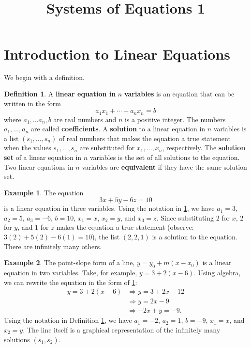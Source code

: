 \documentclass{article}
\title{Systems of Equations 1}
\author{}
\date{}
\theoremstyle{definition}
\newtheorem{definition}{Definition}
\newtheorem{example}{Example}
\begin{document}
\maketitle


\section{Introduction to Linear Equations}\label{sec:introduction}

We begin with a definition.

\begin{definition} \label{def:linear-eqn}
A \textbf{linear equation in} $n$ \textbf{variables} is an equation that can be written in the form
\[a_1x_1+\cdots+a_nx_n=b\]
where $a_1, \ldots a_n, b$ are real numbers and \(n\) is a positive integer. The numbers \(a_1, \ldots, a_n\) are called \textbf{coefficients}. A \textbf{solution} to a linear equation in \(n\) variables is a list \((s_1, \ldots, s_n)\) of real numbers that makes the equation a true statement when the values \(s_1, \ldots, s_n\) are substituted for \(x_1, \ldots, x_n\), respectively. The \textbf{solution set} of a linear equation in \(n\) variables is the set of all solutions to the equation. Two linear equations in \(n\) variables are \textbf{equivalent} if they have the same solution set.
\end{definition}

\begin{example}\label{ex:linear-eqn-3var}
The equation
\[3x+5y-6z=10\]
is a linear equation in three variables. Using the notation in \cref{def:linear-eqn}, we have \(a_1=3\), \(a_2=5\), \(a_3=-6\), \(b=10\), \(x_1=x\), \(x_2=y\), and \(x_3=z\). Since substituting \(2\) for \(x\), \(2\) for \(y\), and \(1\) for \(z\) makes the equation a true statement (observe: \(3(2)+5(2)-6(1)=10\)), the list \((2, 2, 1)\) is a solution to the equation. There are infinitely many others.
\end{example}

\begin{example}\label{ex:linear-eqn-pt-slope}
The point-slope form of a line, \(y=y_0+m(x-x_0)\) is a linear equation in two variables. Take, for example, \(y=3+2(x-6)\). Using algebra, we can rewrite the equation in the form of \cref{def:linear-eqn}:
\begin{align*}
    y=3+2(x-6) &\Longrightarrow y=3+2x-12 \\
    &\Longrightarrow y=2x-9 \\
    &\Longrightarrow -2x+y=-9.
\end{align*}
Using the notation in Definition \ref{def:linear-eqn}, we have \(a_1=-2\), \(a_2=1\), \(b=-9\), \(x_1=x\), and \(x_2=y\). The line itself is a graphical representation of the infinitely many solutions \((s_1, s_2)\).
\end{example}
\end{document}
